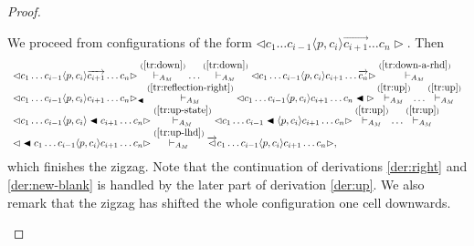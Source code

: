 \documentclass[pre,amssymb,showpacs,showkeys,preprint]{revtex4}
\begin{document}
\begin{proof}
\begin{enumerate}
We proceed from configurations of the form
$\lhd  c_1 \ldots c_{i-1} \langle p,c_{i} \rangle \overrightarrow{c_{i+1}} \ldots c_n \rhd$. Then
\begin{equation}
\begin{array}{l}
\lhd  c_1 \ldots c_{i-1} \langle p,c_{i} \rangle \overrightarrow{c_{i+1}} \ldots c_n \rhd
\stackrel{(\ref{tr:down})}{\vdash_{A_M}} \ldots \stackrel{(\ref{tr:down})}{\vdash_{A_M}}
\lhd  c_1 \ldots c_{i-1} \langle p,c_{i} \rangle c_{i+1} \ldots \overrightarrow{c_n} \rhd
\stackrel{(\ref{tr:down-a-rhd})}{\vdash_{A_M}} \\
\lhd  c_1 \ldots c_{i-1} \langle p,c_{i} \rangle c_{i+1} \ldots  c_n \rhd_\blacktriangleleft
\stackrel{(\ref{tr:reflection-right})}{\vdash_{A_M}}
\lhd  c_1 \ldots c_{i-1} \langle p,c_{i} \rangle c_{i+1} \ldots  c_n \blacktriangleleft \rhd
\stackrel{(\ref{tr:up})}{\vdash_{A_M}} \ldots \stackrel{(\ref{tr:up})}{\vdash_{A_M}} \\
\lhd  c_1 \ldots c_{i-1} \langle p,c_{i} \rangle \blacktriangleleft c_{i+1} \ldots  c_n  \rhd
\stackrel{(\ref{tr:up-state})}{\vdash_{A_M}}
\lhd  c_1 \ldots c_{i-1} \blacktriangleleft \langle p,c_{i} \rangle  c_{i+1} \ldots  c_n  \rhd
\stackrel{(\ref{tr:up})}{\vdash_{A_M}} \ldots \stackrel{(\ref{tr:up})}{\vdash_{A_M}} \\
\lhd  \blacktriangleleft c_1 \ldots c_{i-1} \langle p,c_{i} \rangle  c_{i+1} \ldots  c_n  \rhd
\stackrel{(\ref{tr:up-lhd})}{\vdash_{A_M}}
\overrightarrow{\lhd}  c_1 \ldots c_{i-1} \langle p,c_{i} \rangle  c_{i+1} \ldots  c_n  \rhd,
\end{array}
\label{der:up}
\end{equation}
which finishes the zigzag.
Note that the continuation of derivations \ref{der:right} and \ref{der:new-blank} is handled by the
later part of derivation \ref{der:up}.
We also remark that the zigzag has shifted the whole configuration one cell downwards.

\end{enumerate}


\end{proof}
\end{document}
